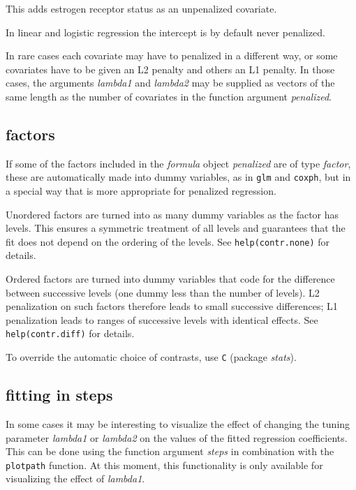 \documentclass[a4paper]{article}
\newcommand{\Robject}[1]{{\texttt{#1}}}
\newcommand{\Rfunction}[1]{{\texttt{#1}}}
\newcommand{\Rpackage}[1]{{\textit{#1}}}
\newcommand{\Rclass}[1]{{\textit{#1}}}
\newcommand{\Rfunarg}[1]{{\textit{#1}}}
\begin{document}
This adds estrogen receptor status as an unpenalized covariate.

In linear and logistic regression the intercept is by default never penalized.

In rare cases  each covariate may have to penalized in a different way, or some covariates have to be given an L2 penalty and others an L1 penalty. In those cases, the arguments \Rfunarg{lambda1} and \Rfunarg{lambda2} may be supplied as vectors of the same length as the number of covariates in the function argument \Rfunarg{penalized}.


\subsection{factors}

If some of the factors included in the \Rclass{formula} object \Rfunarg{penalized} are of type \Rclass{factor}, these are automatically made into dummy variables, as in \Rfunction{glm} and \Rfunction{coxph}, but in a special way that is more appropriate for penalized regression.

Unordered factors are turned into as many dummy variables as the factor has levels. This ensures a symmetric treatment of all levels and guarantees that the fit does not depend on the ordering of the levels. See \Robject{help(contr.none)} for details.

Ordered factors are turned into dummy variables that code for the difference between successive levels (one dummy less than the number of levels). L2 penalization on such factors therefore leads to small successive differences; L1 penalization leads to ranges of successive levels with identical effects. See \Robject{help(contr.diff)} for details.

To override the automatic choice of contrasts, use \Rfunction{C} (package \Rpackage{stats}).


\subsection{fitting in steps}

In some cases it may be interesting to visualize the effect of changing the tuning parameter \Rfunarg{lambda1} or \Rfunarg{lambda2} on the values of the fitted regression coefficients. This can be done using the function argument \Rfunarg{steps} in combination with the \Rfunction{plotpath} function. At this moment, this functionality is only available for visualizing the effect of \Rfunarg{lambda1}.
\end{document}
